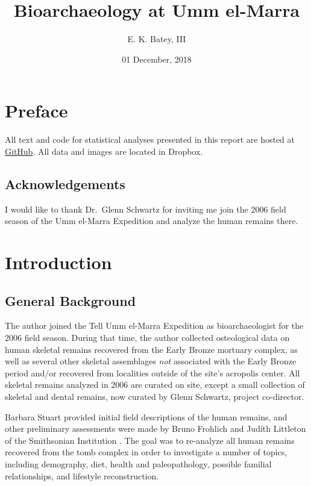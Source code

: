 \documentclass[]{book}
\title{Bioarchaeology at Umm el-Marra}
\author{E. K. Batey, III}
\date{01 December, 2018}
\begin{document}
\maketitle

{
\setcounter{tocdepth}{1}
\tableofcontents
}
\chapter*{Preface}\label{preface}

All text and code for statistical analyses presented in this report are
hosted at \href{https://www.github.com/bateyt/elmarra-bioarch}{GitHub}.
All data and images are located in Dropbox.

\section*{Acknowledgements}\label{acknowledgements}

I would like to thank Dr.~Glenn Schwartz for inviting me join the 2006
field season of the Umm el-Marra Expedition and analyze the human
remains there.

\chapter{Introduction}\label{intro}

\section{General Background}\label{general-background}

The author joined the Tell Umm el-Marra Expedition as bioarchaeologist
for the 2006 field season. During that time, the author collected
osteological data on human skeletal remains recovered from the Early
Bronze mortuary complex, as well as several other skeletal assemblages
\emph{not} associated with the Early Bronze period and/or recovered from
localities outside of the site's acropolis center. All skeletal remains
analyzed in 2006 are curated on site, except a small collection of
skeletal and dental remains, now curated by Glenn Schwartz, project
co-director.

Barbara Stuart provided initial field descriptions of the human remains,
and other preliminary assessments were made by Bruno Frohlich and Judith
Littleton of the Smithsonian Institution \citep{schwartz2007hidden}. The
goal was to re-analyze all human remains recovered from the tomb complex
in order to investigate a number of topics, including demography, diet,
health and paleopathology, possible familial relationships, and
lifestyle reconstruction.
\end{document}
